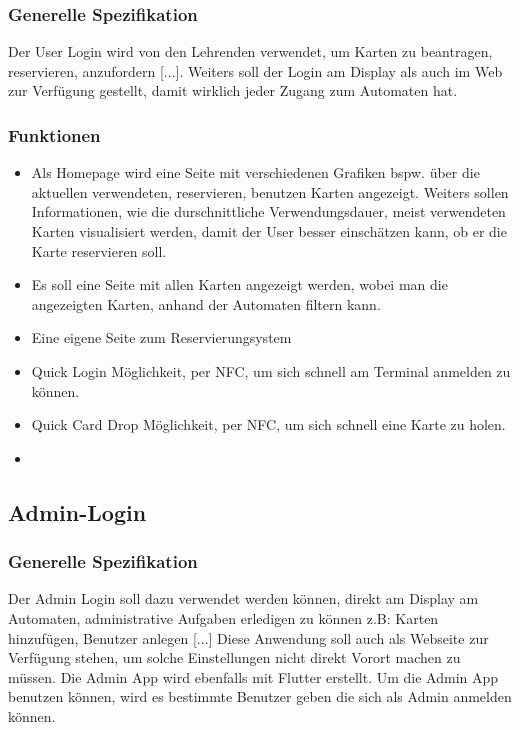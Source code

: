 \documentclass[a4paper]{article}
\begin{document}
\subsubsection{Generelle Spezifikation}
Der User Login wird von den Lehrenden verwendet, um Karten zu beantragen, reservieren, anzufordern [...]. Weiters soll der Login am Display als auch im Web zur Verfügung gestellt, damit wirklich jeder Zugang zum Automaten hat. 

\subsubsection{Funktionen}
\begin{itemize}
  \item Als Homepage wird eine Seite mit verschiedenen Grafiken  bspw. über die aktuellen verwendeten, reservieren, benutzen Karten angezeigt. Weiters sollen Informationen, wie die durschnittliche Verwendungsdauer, meist verwendeten Karten visualisiert werden, damit der User besser einschätzen kann, ob er die Karte reservieren soll.
  \item Es soll eine Seite mit allen Karten angezeigt werden, wobei man die angezeigten Karten, anhand der Automaten filtern kann.
  \item Eine eigene Seite zum Reservierungsystem
  \item Quick Login Möglichkeit, per NFC, um sich schnell am Terminal anmelden zu können. 
  \item Quick Card Drop Möglichkeit, per NFC, um sich schnell eine Karte zu holen.
  \item 
\end{itemize}

\subsection{Admin-Login}
\subsubsection{Generelle Spezifikation}
Der Admin Login soll dazu verwendet werden können, direkt am Display am Automaten, administrative Aufgaben erledigen zu können z.B: Karten hinzufügen, Benutzer anlegen [...] Diese Anwendung soll auch als Webseite zur Verfügung stehen, um solche Einstellungen nicht direkt Vorort machen zu müssen. Die Admin App wird ebenfalls mit Flutter erstellt. Um die Admin App benutzen können, wird es bestimmte Benutzer geben die sich als Admin anmelden können. 
\end{document}
